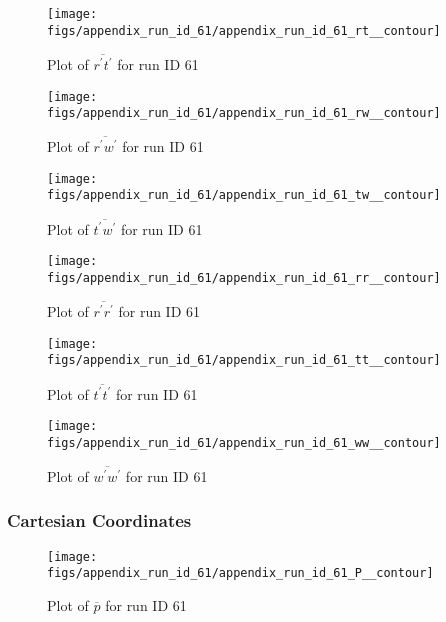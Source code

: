 \begin{figure}[H]
\centering
\texttt{[image: figs/appendix\_run\_id\_61/appendix\_run\_id\_61\_rt\_\_contour]}
\caption{Plot of $\overline{r^\prime t^\prime}$ for run ID 61}
\label{fig:appendix_run_id_61_rt__contour}
\end{figure}


\begin{figure}[H]
\centering
\texttt{[image: figs/appendix\_run\_id\_61/appendix\_run\_id\_61\_rw\_\_contour]}
\caption{Plot of $\overline{r^\prime w^\prime}$ for run ID 61}
\label{fig:appendix_run_id_61_rw__contour}
\end{figure}


\begin{figure}[H]
\centering
\texttt{[image: figs/appendix\_run\_id\_61/appendix\_run\_id\_61\_tw\_\_contour]}
\caption{Plot of $\overline{t^\prime w^\prime}$ for run ID 61}
\label{fig:appendix_run_id_61_tw__contour}
\end{figure}


\begin{figure}[H]
\centering
\texttt{[image: figs/appendix\_run\_id\_61/appendix\_run\_id\_61\_rr\_\_contour]}
\caption{Plot of $\overline{r^\prime r^\prime}$ for run ID 61}
\label{fig:appendix_run_id_61_rr__contour}
\end{figure}


\begin{figure}[H]
\centering
\texttt{[image: figs/appendix\_run\_id\_61/appendix\_run\_id\_61\_tt\_\_contour]}
\caption{Plot of $\overline{t^\prime t^\prime}$ for run ID 61}
\label{fig:appendix_run_id_61_tt__contour}
\end{figure}


\begin{figure}[H]
\centering
\texttt{[image: figs/appendix\_run\_id\_61/appendix\_run\_id\_61\_ww\_\_contour]}
\caption{Plot of $\overline{w^\prime w^\prime}$ for run ID 61}
\label{fig:appendix_run_id_61_ww__contour}
\end{figure}


\subsubsection{Cartesian Coordinates}
\begin{figure}[H]
\centering
\texttt{[image: figs/appendix\_run\_id\_61/appendix\_run\_id\_61\_P\_\_contour]}
\caption{Plot of $\overline{p}$ for run ID 61}
\label{fig:appendix_run_id_61_P__contour}
\end{figure}


